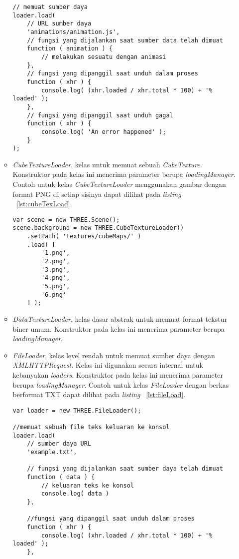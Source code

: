 \begin{itemize}
\begin{itemize}
\begin{lstlisting}[caption={Contoh penggunaan kelas {\it AnimationLoader}.}, label={lst:animationLoad},captionpos=b]
// memuat sumber daya
loader.load(
	// URL sumber daya
	'animations/animation.js',
	// fungsi yang dijalankan saat sumber data telah dimuat
	function ( animation ) {
		// melakukan sesuatu dengan animasi
	},
	// fungsi yang dipanggil saat unduh dalam proses
	function ( xhr ) {
		console.log( (xhr.loaded / xhr.total * 100) + '% loaded' );
	},
	// fungsi yang dipanggil saat unduh gagal
	function ( xhr ) {
		console.log( 'An error happened' );
	}
);
\end{lstlisting}
		\item {\it CubeTextureLoader}, kelas untuk memuat sebuah {\it CubeTexture}. Konstruktor pada kelas ini menerima parameter berupa  {\it loadingManager}. Contoh untuk kelas {\it CubeTextureLoader} menggunakan gambar dengan format PNG di setiap sisinya dapat dilihat pada {\it listing} ~\ref{lst:cubeTexLoad}.
\begin{lstlisting}[caption={Contoh penggunaan kelas {\it CubeTextureLoader}.}, label={lst:cubeTexLoad},captionpos=b]
var scene = new THREE.Scene();
scene.background = new THREE.CubeTextureLoader()
	.setPath( 'textures/cubeMaps/' )
	.load( [
		'1.png',
		'2.png',
		'3.png',
		'4.png',
		'5.png',
		'6.png'
	] );
\end{lstlisting}
		\item {\it DataTextureLoader}, kelas dasar abstrak untuk memuat format tekstur biner umum. Konstruktor pada kelas ini menerima parameter berupa  {\it loadingManager}.
		\item {\it FileLoader}, kelas level rendah untuk memuat sumber daya dengan {\it XMLHTTPRequest}. Kelas ini digunakan secara internal untuk kebanyakan {\it loaders}. Konstruktor pada kelas ini menerima parameter berupa  {\it loadingManager}. Contoh untuk kelas {\it FileLoader} dengan berkas berformat TXT dapat dilihat pada {\it listing} ~\ref{lst:fileLoad}.
\begin{lstlisting}[caption={Contoh penggunaan kelas {\it FileLoader}.}, label={lst:fileLoad},captionpos=b]
var loader = new THREE.FileLoader();

//memuat sebuah file teks keluaran ke konsol
loader.load(
    // sumber daya URL
    'example.txt',

    // fungsi yang dijalankan saat sumber daya telah dimuat
    function ( data ) {
        // keluaran teks ke konsol
        console.log( data )
    },

    //fungsi yang dipanggil saat unduh dalam proses
    function ( xhr ) {
        console.log( (xhr.loaded / xhr.total * 100) + '% loaded' );
    },


\end{lstlisting}
\end{itemize}
\end{itemize}
